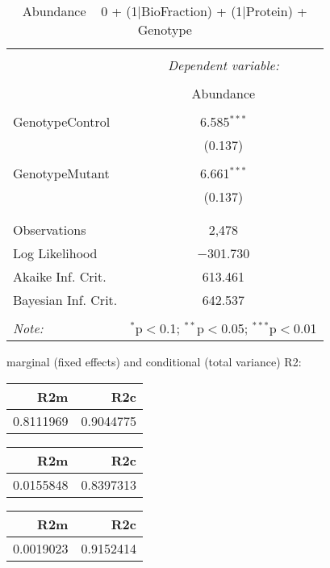 \documentclass[11pt]{report}
\begin{document}
\begin{table}[!htbp] \centering 
  \caption{Abundance ~ 0 + (1|BioFraction) + (1|Protein) + Genotype} 
  \label{} 
\begin{tabular}{@{\extracolsep{5pt}}lc} 
\\[-1.8ex]\hline 
\hline \\[-1.8ex] 
 & \multicolumn{1}{c}{\textit{Dependent variable:}} \\ 
\cline{2-2} 
\\[-1.8ex] & Abundance \\ 
\hline \\[-1.8ex] 
 GenotypeControl & 6.585$^{***}$ \\ 
  & (0.137) \\ 
  & \\ 
 GenotypeMutant & 6.661$^{***}$ \\ 
  & (0.137) \\ 
  & \\ 
\hline \\[-1.8ex] 
Observations & 2,478 \\ 
Log Likelihood & $-$301.730 \\ 
Akaike Inf. Crit. & 613.461 \\ 
Bayesian Inf. Crit. & 642.537 \\ 
\hline 
\hline \\[-1.8ex] 
\textit{Note:}  & \multicolumn{1}{r}{$^{*}$p$<$0.1; $^{**}$p$<$0.05; $^{***}$p$<$0.01} \\ 
\end{tabular} 
\end{table} 
marginal (fixed effects) and conditional (total variance) R2:

\begin{tabular}{r|r}
\hline
R2m & R2c\\
\hline
0.8111969 & 0.9044775\\
\hline
\end{tabular}

\begin{tabular}{r|r}
\hline
R2m & R2c\\
\hline
0.0155848 & 0.8397313\\
\hline
\end{tabular}

\begin{tabular}{r|r}
\hline
R2m & R2c\\
\hline
0.0019023 & 0.9152414\\
\hline
\end{tabular}
\end{document}
